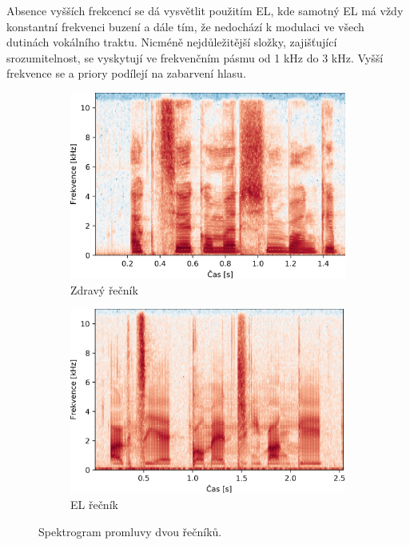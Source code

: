 Absence vyšších frekcencí se dá vysvětlit použitím EL, kde samotný EL má vždy konstantní frekvenci buzení a dále tím, že nedochází k modulaci ve všech dutinách vokálního traktu. Nicméně nejdůležitější složky, zajišťující srozumitelnost, se vyskytují ve frekvenčním pásmu od 1 kHz do 3 kHz. Vyšší frekvence se a priory podílejí na zabarvení hlasu.

\begin{figure}[htpb]
  \centering
  \begin{subfigure}[b]{0.4\textwidth}
    \includegraphics[width=\textwidth]{./ch5-construction/img/spectrogram_normal.png}
    \caption{Zdravý řečník}
    \label{fig:construction:spectrogram:normal}
  \end{subfigure}
  \begin{subfigure}[b]{0.4\textwidth}
    \includegraphics[width=\textwidth]{./ch5-construction/img/spectrogram_el.png}
    \caption{EL řečník}
    \label{fig:construction:spectrogram:el}
  \end{subfigure}
  \caption{Spektrogram promluvy  dvou řečníků.}
  \label{fig:construction:spectrogram}
\end{figure}

